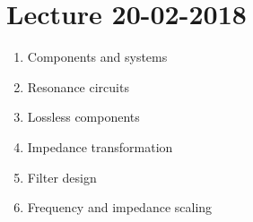 \section{Lecture 20-02-2018}

\begin{enumerate}
	\item Components and systems
	\item Resonance circuits
	\item Lossless components
	\item Impedance transformation
	\item Filter design
	\item Frequency and impedance scaling
\end{enumerate}

\noindent{} \vspace{3mm}

